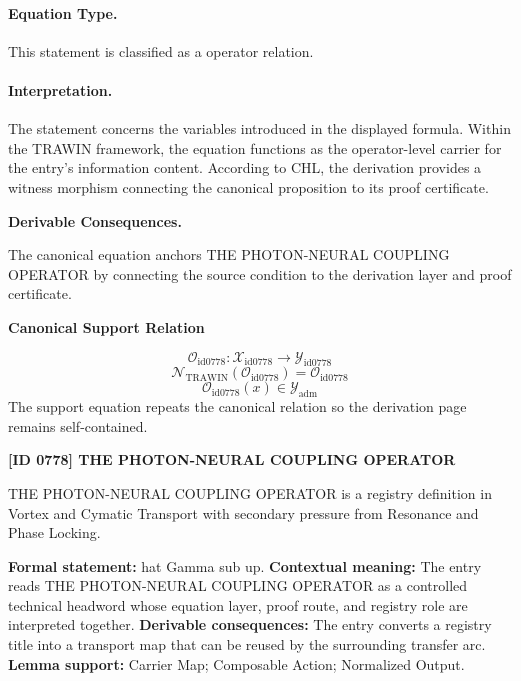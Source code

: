 \paragraph{Equation Type.}
This statement is classified as a operator relation.

\paragraph{Interpretation.}
The statement concerns the variables introduced in the displayed formula. Within the TRAWIN framework, the equation functions as the operator-level carrier for the entry’s information content. According to CHL, the derivation provides a witness morphism connecting the canonical proposition to its proof certificate.

\par\vspace{0.35em}
\noindent\textbf{Derivable Consequences.}\quad
\begingroup
\footnotesize
\raggedright
The canonical equation anchors THE PHOTON-NEURAL COUPLING OPERATOR by connecting the source condition to the derivation layer and proof certificate.
\par\endgroup

\noindent\textbf{Canonical Support Relation}\par
\[
\mathcal{O}_{\mathrm{id0778}}:\mathcal{X}_{\mathrm{id0778}}\longrightarrow\mathcal{Y}_{\mathrm{id0778}}
\]
\[
\mathcal{N}_{\mathrm{TRAWIN}}(\mathcal{O}_{\mathrm{id0778}})=\mathcal{O}_{\mathrm{id0778}}
\]
\[
\mathcal{O}_{\mathrm{id0778}}(x)\in\mathcal{Y}_{\mathrm{adm}}
\]
\noindent The support equation repeats the canonical relation so the derivation page remains self-contained.\par

\clearpage
\noindent\textbf{[ID 0778] THE PHOTON-NEURAL COUPLING OPERATOR}\par
\vspace{0.35em}
\begingroup\small
{}
THE PHOTON-NEURAL COUPLING OPERATOR is a registry definition in Vortex and Cymatic Transport with secondary pressure from Resonance and Phase Locking.

\begingroup\footnotesize\setlength{\emergencystretch}{3em}\sloppy
\textbf{Formal statement:} hat Gamma sub up. \textbf{Contextual meaning:} The entry reads THE PHOTON-NEURAL COUPLING OPERATOR as a controlled technical headword whose equation layer, proof route, and registry role are interpreted together. \textbf{Derivable consequences:} The entry converts a registry title into a transport map that can be reused by the surrounding transfer arc. \textbf{Lemma support:} Carrier Map; Composable Action; Normalized Output.\par
\endgroup

